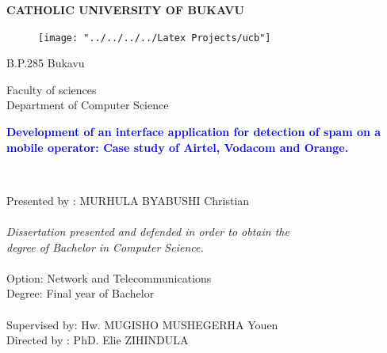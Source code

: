 \documentclass[12pt,a4paper, oneside]{book}
\begin{document}
 
	
	\begin{titlepage}
		\centering \Large \textbf{CATHOLIC UNIVERSITY OF BUKAVU}\\
		\begin{center}
			\begin{figure}[h]
				\centering
				\texttt{[image: "../../../../Latex Projects/ucb"]}
			\end{figure}
			\large{B.P.285 Bukavu}
		\end{center}
		\begin{center}
			\huge{\large{Faculty of sciences  }} \\
			{\Large \hspace*{0.7cm} Department of Computer Science}  
		\end{center}
		\hrulefill
		\begin{center}\bfseries\Large
			\textcolor{blue}{Development of an interface application for detection of spam on a mobile operator: Case study of Airtel, Vodacom and Orange.}\normalsize
		\end{center}
		\hrulefill \\
		
		\vspace{1\baselineskip}
		\normalsize 
			\begin {minipage}{0.5 \textwidth }	
		\begin{flushright}
			{
				\vspace {0.1cm} 
				\begin{tabbing}					
					\hspace*{3.4cm}Presented by : \normalsize{MURHULA BYABUSHI Christian}  \\
					\\
					\hspace{3.4cm}\textit{Dissertation presented and defended in order to obtain the}\\
					\hspace{3.4cm}\textit{degree of Bachelor in Computer Science.}\\
					\vspace*{0.1cm}\\
					\hspace*{3.4					
						cm}Option: Network and Telecommunications\\					
					\hspace*{3.4cm}Degree: Final year of Bachelor\\ 
					\\
					\hspace*{3.4cm}Supervised by: Hw. MUGISHO MUSHEGERHA Youen \\
					\hspace*{3.4cm}Directed by : PhD. Elie ZIHINDULA
						

\end{tabbing}}
\end{flushright}
\end{minipage}
\end{titlepage}
\end{document}
